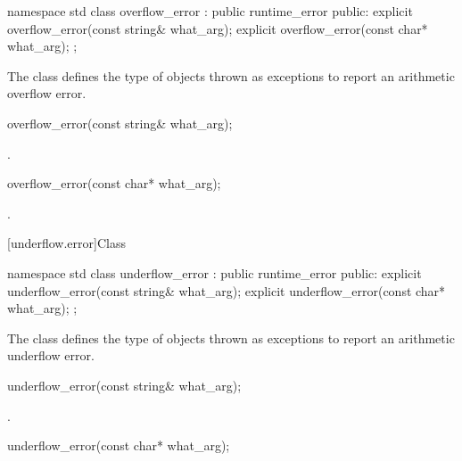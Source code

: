%
\begin{codeblock}
namespace std {
  class overflow_error : public runtime_error {
  public:
    explicit overflow_error(const string& what_arg);
    explicit overflow_error(const char* what_arg);
  };
}
\end{codeblock}

\pnum
The class
defines the type of objects thrown as exceptions to report an arithmetic overflow error.

%
\begin{itemdecl}
overflow_error(const string& what_arg);
\end{itemdecl}

\begin{itemdescr}
\pnum
\ensures
{}.
\end{itemdescr}

%
\begin{itemdecl}
overflow_error(const char* what_arg);
\end{itemdecl}

\begin{itemdescr}
\pnum
\ensures
{}.
\end{itemdescr}

[underflow.error]{Class }

%
\begin{codeblock}
namespace std {
  class underflow_error : public runtime_error {
  public:
    explicit underflow_error(const string& what_arg);
    explicit underflow_error(const char* what_arg);
  };
}
\end{codeblock}

\pnum
The class
defines the type of objects thrown as exceptions to report an arithmetic underflow error.

%
\begin{itemdecl}
underflow_error(const string& what_arg);
\end{itemdecl}

\begin{itemdescr}
\pnum
\ensures
{}.
\end{itemdescr}

%
\begin{itemdecl}
underflow_error(const char* what_arg);
\end{itemdecl}

